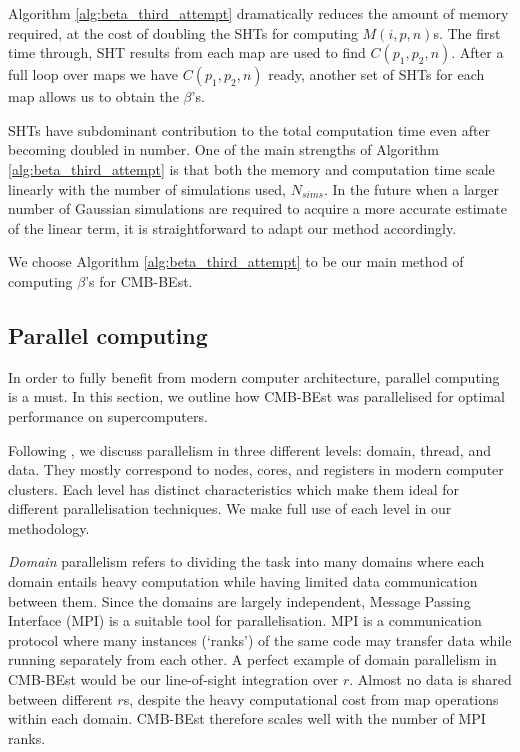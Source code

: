 Algorithm \ref{alg:beta_third_attempt} dramatically reduces the amount of memory required, at the cost of doubling the SHTs for computing $M(i,p,n)$s. The first time through, SHT results from each map are used to find $C(p_1,p_2,n)$. After a full loop over maps we have $C(p_1,p_2,n)$ ready, another set of SHTs for each map allows us to obtain the $\beta$'s.

SHTs have subdominant contribution to the total computation time even after becoming doubled in number. One of the main strengths of Algorithm \ref{alg:beta_third_attempt} is that both the memory and computation time scale linearly with the number of simulations used, $N_{sims}$. In the future when a larger number of Gaussian simulations are required to acquire a more accurate estimate of the linear term, it is straightforward to adapt our method accordingly.

We choose Algorithm \ref{alg:beta_third_attempt} to be our main method of computing $\beta$'s for CMB-BEst.

\subsection{Parallel computing}


In order to fully benefit from modern computer architecture, parallel computing is a must. In this section, we outline how CMB-BEst was parallelised for optimal performance on supercomputers.

Following \cite{Jeffers2016intel}, we discuss parallelism in three different levels: domain, thread, and data. They mostly correspond to nodes, cores, and registers in modern computer clusters. Each level has distinct characteristics which make them ideal for different parallelisation techniques. We make full use of each level in our methodology.

\textit{Domain} parallelism refers to dividing the task into many domains where each domain entails heavy computation while having limited data communication between them. Since the domains are largely independent, Message Passing Interface (MPI) is a suitable tool for parallelisation. MPI is a communication protocol where many instances (`ranks') of the same code may transfer data while running separately from each other. A perfect example of domain parallelism in CMB-BEst would be our line-of-sight integration over $r$. Almost no data is shared between different $r$s, despite the heavy computational cost from map operations within each domain. CMB-BEst therefore scales well with the number of MPI ranks.

